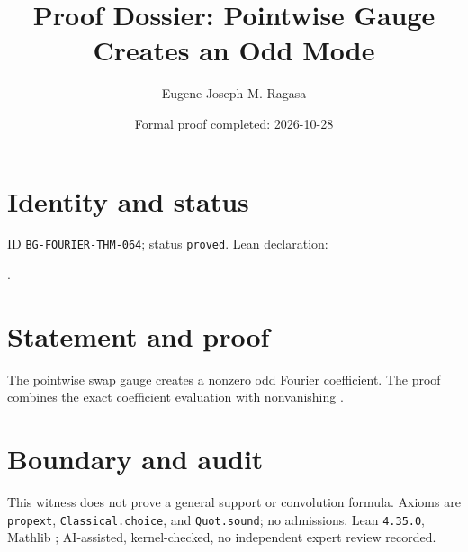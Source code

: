 \documentclass[11pt]{article}
\title{Proof Dossier: Pointwise Gauge Creates an Odd Mode}\author{Eugene Joseph M. Ragasa}\date{Formal proof completed: 2026-10-28}
\begin{document}
\raggedright\maketitle
\section{Identity and status}
ID \texttt{BG-FOURIER-THM-064}; status \texttt{proved}. Lean declaration:
\par{}.
\section{Statement and proof}
The pointwise swap gauge creates a nonzero odd Fourier coefficient. The proof combines the exact coefficient evaluation  with nonvanishing .
\section{Boundary and audit}
This witness does not prove a general support or convolution formula. Axioms are \texttt{propext}, \texttt{Classical.choice}, and \texttt{Quot.sound}; no admissions. Lean \texttt{4.35.0}, Mathlib {\scriptsize{}}; AI-assisted, kernel-checked, no independent expert review recorded.
\end{document}
